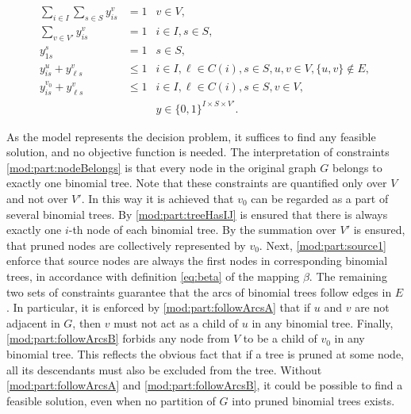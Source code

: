 \begin{subequations}\label{mod:partition}
\begin{align}
\label{mod:part:nodeBelongs} \sum\limits_{i\in I}\sum\limits_{s\in S}y^v_{is} & = 1 & v\in V,\\
\label{mod:part:treeHasIJ} \sum\limits_{v\in V'}y^v_{is} & = 1 & i\in I,s\in S,\\
\label{mod:part:source1} y_{1s}^s & = 1  & s\in S,\\
\label{mod:part:followArcsA} y^u_{is}+y^v_{\ell s} &\leq 1 & i\in I,\ell\in C(i), s\in S, u,v\in V,\{u,v\}\not\in E,\\
\label{mod:part:followArcsB} y^{v_0}_{is}+y^v_{\ell s} &\leq 1 & i\in I,\ell\in C(i), s\in S, v\in V,\\
\label{mod:part:dim}&&y \in \{0,1\}^{I\times S\times V'}.
\end{align}~
\end{subequations}

As the model represents the decision problem, it suffices to find any feasible solution, and no objective function is needed.
The interpretation of constraints \eqref{mod:part:nodeBelongs} is that every node in the original graph $G$ belongs to exactly one binomial tree.
Note that these constraints are quantified only over $V$ and not over $V'$.
In this way it is achieved that $v_0$ can be regarded as a part of several binomial trees.
By \eqref{mod:part:treeHasIJ} is ensured that there is always exactly one $i$-th node of each binomial tree.
By the summation over $V'$ is ensured, that pruned nodes are collectively represented by $v_0$.
Next, \eqref{mod:part:source1} enforce that source nodes are always the first nodes in corresponding binomial trees, in accordance with definition \eqref{eq:beta} of the mapping $\beta$.
The remaining two sets of constraints guarantee that the arcs of binomial trees follow edges in $E$.
In particular, it is enforced by \eqref{mod:part:followArcsA} that if $u$ and $v$ are not adjacent in $G$, then $v$ must not act as a child of $u$ in any binomial tree.
Finally, \eqref{mod:part:followArcsB} forbids any node from $V$ to be a child of $v_0$ in any binomial tree. 
This reflects the obvious fact that if a tree is pruned at some node, all its descendants must also be excluded from the tree.
Without \eqref{mod:part:followArcsA} and \eqref{mod:part:followArcsB}, it could be possible to find a feasible solution, even when no partition of $G$ into pruned binomial trees exists.


